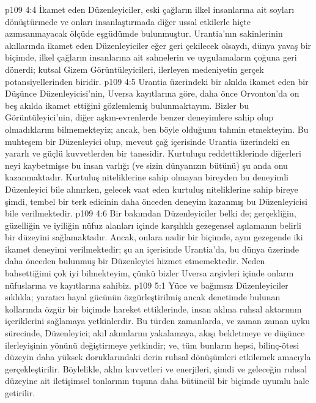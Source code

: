 \vs p109 4:4 İkamet eden Düzenleyiciler, eski çağların ilkel insanlarına ait soyları dönüştürmede ve onları insanlaştırmada diğer ussal etkilerle hiçte azımsanmayacak ölçüde eşgüdümde bulunmuştur. Urantia’nın sakinlerinin akıllarında ikamet eden Düzenleyiciler eğer geri çekilecek olsaydı, dünya yavaş bir biçimde, ilkel çağların insanlarına ait sahnelerin ve uygulamaların çoğuna geri dönerdi; kutsal Gizem Görüntüleyicileri, ilerleyen medeniyetin gerçek potansiyellerinden biridir.
\vs p109 4:5 Urantia üzerindeki bir akılda ikamet eden bir Düşünce Düzenleyicisi’nin, Uversa kayıtlarına göre, daha önce Orvonton’da on beş akılda ikamet ettiğini gözlemlemiş bulunmaktayım. Bizler bu Görüntüleyici’nin, diğer aşkın\hyp{}evrenlerde benzer deneyimlere sahip olup olmadıklarını bilmemekteyiz; ancak, ben böyle olduğunu tahmin etmekteyim. Bu muhteşem bir Düzenleyici olup, mevcut çağ içerisinde Urantia üzerindeki en yararlı ve güçlü kuvvetlerden bir tanesidir. Kurtuluşu reddettiklerinde diğerleri neyi kaybetmişse bu insan varlığı (ve sizin dünyanızın bütünü) şu anda onu kazanmaktadır. Kurtuluş niteliklerine sahip olmayan bireyden bu deneyimli Düzenleyici bile alınırken, gelecek vaat eden kurtuluş niteliklerine sahip bireye şimdi, tembel bir terk edicinin daha önceden deneyim kazanmış bu Düzenleyicisi bile verilmektedir.
\vs p109 4:6 Bir bakımdan Düzenleyiciler belki de; gerçekliğin, güzelliğin ve iyiliğin nüfuz alanları içinde karşılıklı gezegensel aşılamanın belirli bir düzeyini sağlamaktadır. Ancak, onlara nadir bir biçimde, aynı gezegende iki ikamet deneyimi verilmektedir; şu an içerisinde Urantia’da, bu dünya üzerinde daha önceden bulunmuş bir Düzenleyici hizmet etmemektedir. Neden bahsettiğimi çok iyi bilmekteyim, çünkü bizler Uversa arşivleri içinde onların nüfuslarına ve kayıtlarına sahibiz.
\vs p109 5:1 Yüce ve bağımsız Düzenleyiciler sıklıkla; yaratıcı hayal gücünün özgürleştirilmiş ancak denetimde bulunan kollarında özgür bir biçimde hareket ettiklerinde, insan aklına ruhsal aktarımın içeriklerini sağlamaya yetkinlerdir. Bu türden zamanlarda, ve zaman zaman uyku sürecinde, Düzenleyici; akıl akımlarını yakalamaya, akışı bekletmeye ve düşünce ilerleyişinin yönünü değiştirmeye yetkindir; ve, tüm bunların hepsi, bilinç\hyp{}ötesi düzeyin daha yüksek doruklarındaki derin ruhsal dönüşümleri etkilemek amacıyla gerçekleştirilir. Böylelikle, aklın kuvvetleri ve enerjileri, şimdi ve geleceğin ruhsal düzeyine ait iletişimsel tonlarının tuşuna daha bütüncül bir biçimde uyumlu hale getirilir.
